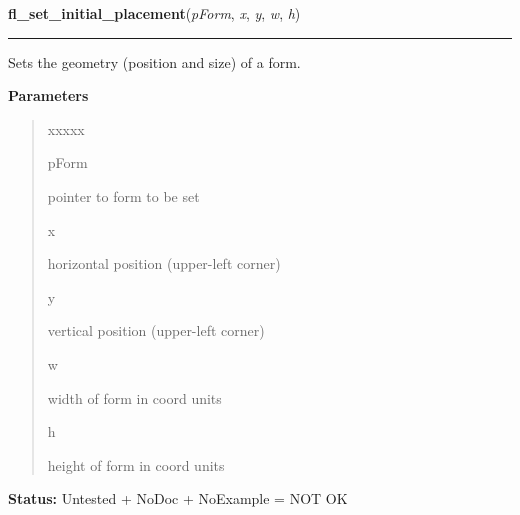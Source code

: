 \hspace{.8\funcindent}\begin{boxedminipage}{\funcwidth}

    \raggedright \textbf{fl\_set\_initial\_placement}(\textit{pForm}, \textit{x}, \textit{y}, \textit{w}, \textit{h})

    \vspace{-1.5ex}

    \rule{\textwidth}{0.5\fboxrule}
\setlength{\parskip}{2ex}
    Sets the geometry (position and size) of a form.

\setlength{\parskip}{1ex}
      \textbf{Parameters}
      \vspace{-1ex}

      \begin{quote}
        \begin{Ventry}{xxxxx}

          \item[pForm]

          pointer to form to be set

          \item[x]

          horizontal position (upper-left corner)

          \item[y]

          vertical position (upper-left corner)

          \item[w]

          width of form in coord units

          \item[h]

          height of form in coord units

        \end{Ventry}

      \end{quote}

\textbf{Status:} Untested + NoDoc + NoExample = NOT OK



    \end{boxedminipage}

    \label{xformslib:library:fl_show_form}

    \vspace{0.5ex}

